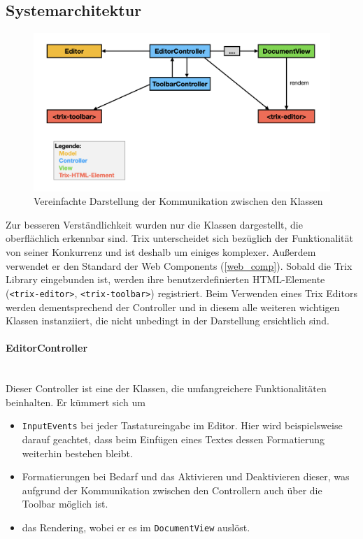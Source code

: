 \subsection{Systemarchitektur}
\begin{figure}[H]
\begin{center}
	\includegraphics[scale=.4]{images/sysarch.png}
\end{center}
	\caption{Vereinfachte Darstellung der Kommunikation zwischen den Klassen}
\end{figure}

Zur besseren Verständlichkeit wurden nur die Klassen dargestellt, die oberflächlich erkennbar sind. Trix unterscheidet sich bezüglich der Funktionalität von seiner Konkurrenz und ist deshalb um einiges komplexer. Außerdem verwendet er den Standard der Web Components (\ref{web_comp}). Sobald die Trix Library eingebunden ist, werden ihre benutzerdefinierten HTML-Elemente (\texttt{<trix-editor>}, \texttt{<trix-toolbar>}) registriert. Beim Verwenden eines Trix Editors werden dementsprechend der Controller und in diesem alle weiteren wichtigen Klassen instanziiert, die nicht unbedingt in der Darstellung ersichtlich sind. 

\paragraph{EditorController}\mbox{}\\
Dieser Controller ist eine der Klassen, die umfangreichere Funktionalitäten beinhalten. Er kümmert sich um 

\begin{itemize}
	\item \texttt{InputEvents} bei jeder Tastatureingabe im Editor. Hier wird beispielsweise darauf geachtet, dass beim Einfügen eines Textes dessen Formatierung weiterhin bestehen bleibt.
	\item Formatierungen bei Bedarf und das Aktivieren und Deaktivieren dieser, was aufgrund der Kommunikation zwischen den Controllern auch über die Toolbar möglich ist.
	\item das Rendering, wobei er es im \texttt{DocumentView} auslöst.
\end{itemize}

